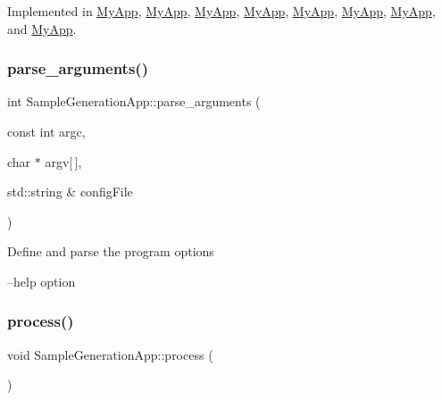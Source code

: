 Implemented in \hyperlink{class_my_app_a376d7e3ddb7ab21223f29a7263b6fb14}{My\+App}, \hyperlink{class_my_app_ab3cc458e74a9fc059504fa33983249ee}{My\+App}, \hyperlink{class_my_app_a376d7e3ddb7ab21223f29a7263b6fb14}{My\+App}, \hyperlink{class_my_app_a376d7e3ddb7ab21223f29a7263b6fb14}{My\+App}, \hyperlink{class_my_app_a376d7e3ddb7ab21223f29a7263b6fb14}{My\+App}, \hyperlink{class_my_app_a376d7e3ddb7ab21223f29a7263b6fb14}{My\+App}, \hyperlink{class_my_app_a376d7e3ddb7ab21223f29a7263b6fb14}{My\+App}, and \hyperlink{class_my_app_a376d7e3ddb7ab21223f29a7263b6fb14}{My\+App}.

\mbox{\label{class_sample_generation_app_a4304bff49d553420b6cf436fad6f5e6a}} 
\subsubsection{\texorpdfstring{parse\+\_\+arguments()}{parse\_arguments()}}
{\footnotesize\ttfamily int Sample\+Generation\+App\+::parse\+\_\+arguments (\begin{DoxyParamCaption}\item[{const int}]{argc,  }\item[{char $\ast$}]{argv\mbox{[}$\,$\mbox{]},  }\item[{std\+::string \&}]{config\+File }\end{DoxyParamCaption})\hspace{0.3cm}{\ttfamily [protected]}}

Define and parse the program options

--help option\mbox{\label{class_sample_generation_app_acec58569149ac1fc8af9525d35b9e88a}} 
\subsubsection{\texorpdfstring{process()}{process()}}
{\footnotesize\ttfamily void Sample\+Generation\+App\+::process (\begin{DoxyParamCaption}{ }\end{DoxyParamCaption})}

